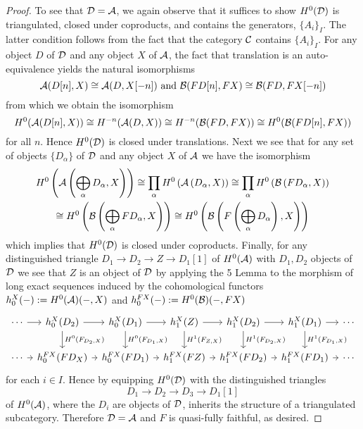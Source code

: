 \begin{proof}
  To see that \(\mathcal{D} = \mathcal{A}\), we again observe that it suffices to show \(H^0(\mathcal{D})\) is triangulated, closed under coproducts, and contains the generators, \(\{A_i\}_I\).
  The latter condition follows from the fact that the category \(\mathcal{C}\) contains \(\{A_i\}_I\).
  For any object \(D\) of \(\mathcal{D}\) and any object \(X\) of \(\mathcal{A}\), the fact that translation is an auto-equivalence yields the natural isomorphisms
  \[\A(D[n], X) \cong \A(D, X[-n])\ \text{and}\ \B(FD[n], FX) \cong \B(FD, FX[-n])\]
  from which we obtain the isomorphism
  \[H^0(\mathcal{A}(D[n], X)) \cong H^{-n}(\mathcal{A}(D,X)) \cong H^{-n}(\mathcal{B}(FD, FX)) \cong H^0(\mathcal{B}(FD[n], FX))\]
  for all \(n\).
  Hence \(H^0(\mathcal{D})\) is closed under translations.
  Next we see that for any set of objects \(\{D_\alpha\}\) of \(\mathcal{D}\) and any object \(X\) of \(\mathcal{A}\) we have the isomorphism
  \begin{gather*}
    H^0\left(\mathcal{A}\left(\bigoplus_\alpha D_\alpha, X\right)\right)
  \cong \prod_\alpha H^0\left(\mathcal{A}\left(D_\alpha, X\right)\right)
    \cong \prod_\alpha H^0\left(\mathcal{B}\left(FD_\alpha, X\right)\right)\\
    \cong H^0\left(\mathcal{B}\left(\bigoplus_\alpha FD_\alpha, X\right)\right)
    \cong H^0\left(\mathcal{B}\left(F\left(\bigoplus_\alpha D_\alpha\right), X\right)\right)
  \end{gather*}
  which implies that \(H^0(\mathcal{D})\) is closed under coproducts.
  Finally, for any distinguished triangle \(D_1 \to D_2 \to Z \to D_1[1]\) of \(H^0(\mathcal{A})\) with \(D_1, D_2\) objects of \(\mathcal{D}\) we see that \(Z\) is an object of \(\mathcal{D}\) by applying the 5 Lemma to the morphism of long exact sequences induced by the cohomological functors \(h^X_0(-) := H^0(\mathcal{A})(-, X)\) and \(h^{FX}_0(-) := H^0(\mathcal{B})(-, FX)\)
  \[\begin{tikzcd}[column sep=tiny]
  \cdots \arrow{r} & h^X_0(D_2) \arrow{r}\arrow{d}{H^0(F_{D_2,X})} & h^X_0(D_1) \arrow{r}\arrow{d}{H^0(F_{D_1,X})} & h^X_1(Z) \arrow{r}\arrow{d}{H^1(F_{Z,X})} & h^X_1(D_2) \arrow{r}\arrow{d}{H^1(F_{D_2,X})} & h^X_1(D_1) \arrow{d}{H^1(F_{D_1,X})}\arrow{r}& \cdots\\
  \cdots \arrow{r} & h^{FX}_0(FD_X) \arrow{r} & h^{FX}_0(FD_1) \arrow{r} & h^{FX}_1(FZ) \arrow{r} & h^{FX}_1(FD_2) \arrow{r} & h^{FX}_1(FD_1)\arrow{r} & \cdots
  \end{tikzcd}\]
  for each \(i \in I\).
  Hence by equipping \(H^0(\mathcal{D})\) with the distinguished triangles
  \[D_1 \to D_2 \to D_3 \to D_1[1]\]
  of \(H^0(\mathcal{A})\), where the \(D_i\) are objects of \(\mathcal{D}\), inherits the structure of a triangulated subcategory.
  Therefore \(\mathcal{D} = \mathcal{A}\) and \(F\) is quasi-fully faithful, as desired.
\end{proof}
